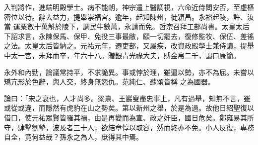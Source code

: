 \begin{pinyinscope}
 入判將作，進端明殿學士。病不能朝，神宗遣上醫調視，六命近侍問安否，至虛樞密位以待。辭去益力，提舉崇福宮。逾年，起知陳州，徙穎昌。永裕起陵，許、汝當
 運粟數十萬斛於陵下，調民牛數萬，永請而免。哲宗召拜工部尚書。太皇太后下詔求言，永陳保馬、保甲、免役三事最敝，願一切罷去，復修監牧、保伍、差徭之法。太皇太后皆納之。元祐元年，遷吏部，又屬疾，改資政殿學士兼侍讀，提舉中太一宮，未拜而卒，年六十八。贈銀青光祿大夫，賻金帛二千，謚曰康簡。



 永外和內勁，論議常持平，不求詭異。事或悖於理，雖逼以勢，亦不為屈。未嘗以矯亢形於色辭，與人交，終身無怨仇。范純仁、蘇頌皆稱
 之為國器。



 論曰：「宋之衰也，人才尚多。梁燾、王巖叟盡忠事上，凡有過舉，知無不言，雖或從或違，而隱然有虎豹在山之勢矣。第以新州之舉，於是為過。故他日紹聖復以借口，使元祐眾賢皆罹其禍，由是再變而為宣、政之奸臣，國日危矣。鄭雍易其所守，肆擊劉摯，波及者三十人，欲結章惇以取容，然而終亦不免。小人反復，專務自全，竟何益哉？孫永之為人，庶得其中焉。



\end{pinyinscope}